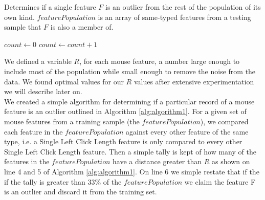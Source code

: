 \documentclass[conference]{IEEEtran}
\begin{document}
\begin{algorithm}

\caption{Determines if a single feature $F$ is an outlier from the rest of the population of its own kind. $featurePopulation$ is an array of same-typed features from a testing sample that $F$ is also a member of.}\label{euclid}
\begin{algorithmic}[1]
\State $\textit{count} \gets 0$
				\State $count \gets count + 1$
			\EndIf
	\EndFor

		\State {}
	\Else
		\State {} 

	\EndIf
\EndProcedure
\end{algorithmic}
\label{alg:algorithm1}

\end{algorithm}

We defined a variable $R$, for each mouse feature, a number large enough to include most of the population while small enough to remove the noise from the data. We found optimal values for our $R$ values after extensive experimentation we will describe later on.\\
We created a simple algorithm for determining if a particular record of a mouse feature is an outlier outlined in Algorithm \ref{alg:algorithm1}. For a given set of mouse features from a training sample (the $featurePopulation$), we compared each feature in the $featurePopulation$ against every other feature of the same type, i.e. a Single Left Click Length feature is only compared to every other Single Left Click Length feature. Then a simple tally is kept of how many of the features in the $featurePopulation$ have a distance greater than $R$ as shown on line 4 and 5 of Algorithm \ref{alg:algorithm1}. On line 6 we simple restate that if the if the tally is greater than 33\% of the $featurePopulation$ we claim the feature F is an outlier and discard it from the training set.
\end{document}
